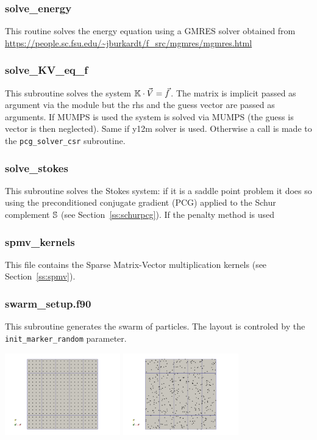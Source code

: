  \subsubsection{solve\_energy}
 This routine solves the energy equation using a GMRES solver obtained from 
 \url{https://people.sc.fsu.edu/~jburkardt/f_src/mgmres/mgmres.html} 
 \subsubsection{solve\_KV\_eq\_f}
 This subroutine solves the system ${\mathbb{K}}\cdot \vec{V} = \vec{f}$. The matrix is 
 implicit passed as argument via the module but the rhs and the guess vector are 
 passed as arguments.
 If MUMPS is used the system is solved via MUMPS (the guess is vector
 is then neglected). Same if y12m solver is used. 
 Otherwise a call is made to the {\tt pcg\_solver\_csr} subroutine.
 \subsubsection{solve\_stokes}
 This subroutine solves the Stokes system: if it is a saddle point problem 
 it does so using the preconditioned conjugate gradient (PCG) applied 
 to the Schur complement ${\mathbb{S}}$  (see Section~\ref{ss:schurpcg}).
 If the penalty method is used 
 \subsubsection{spmv\_kernels}
 This file contains the Sparse Matrix-Vector multiplication kernels (see Section~\ref{ss:spmv}).
 \subsubsection{swarm\_setup.f90}
 This subroutine generates the swarm of particles. The layout is controled 
 by the {\tt init\_marker\_random} parameter.
 \begin{center}
 \includegraphics[width=5cm]{ELEFANT/images/swarm_reg} 
 \includegraphics[width=5cm]{ELEFANT/images/swarm_rand} 
 \end{center}
